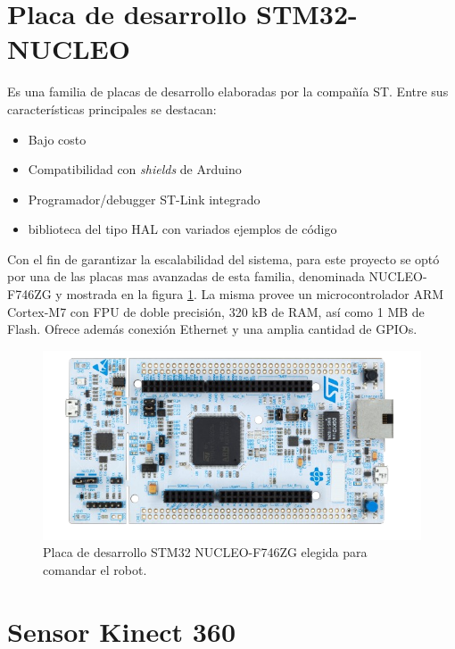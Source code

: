 \section{Placa de desarrollo STM32-NUCLEO}

Es una familia de placas de desarrollo elaboradas por la compañía ST. Entre sus características principales se destacan:

\begin{itemize}
    \item Bajo costo
    \item Compatibilidad con \textit{shields} de Arduino
    \item Programador/debugger ST-Link integrado
    \item biblioteca del tipo HAL con variados ejemplos de código
\end{itemize}

Con el fin de garantizar la escalabilidad del sistema, para este proyecto se optó por una de las placas mas avanzadas de esta familia, denominada NUCLEO-F746ZG y mostrada en la figura \ref{fig:stm32nucleo}. La misma provee un microcontrolador ARM Cortex-M7 con FPU de doble precisión, 320 kB de RAM, así como 1 MB de Flash. Ofrece además conexión Ethernet y una amplia cantidad de GPIOs.

\begin{figure}[ht]
    \centering
    \includegraphics[scale=1.5]{./Figures/stm32nucleo.png}
    \caption{Placa de desarrollo STM32 NUCLEO-F746ZG elegida para comandar el robot.\protect\footnotemark}
    \label{fig:stm32nucleo}
\end{figure}


\section{Sensor Kinect 360}

